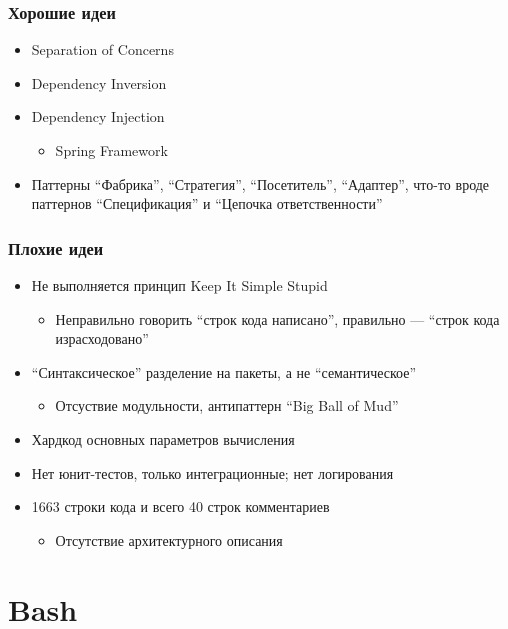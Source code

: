 \documentclass{../text-style}
\begin{document}
    \begin{frame}
        \frametitle{Хорошие идеи}
        \begin{itemize}
            \item Separation of Concerns
            \item Dependency Inversion
            \item Dependency Injection
            \begin{itemize}
                \item Spring Framework
            \end{itemize}
            \item Паттерны ``Фабрика'', ``Стратегия'', ``Посетитель'', ``Адаптер'', что-то вроде паттернов ``Спецификация'' и ``Цепочка ответственности''
        \end{itemize}
    \end{frame}

    \begin{frame}
        \frametitle{Плохие идеи}
        \begin{itemize}
            \item Не выполняется принцип Keep It Simple Stupid
            \begin{itemize}
                \item Неправильно говорить ``строк кода написано'', правильно --- ``строк кода израсходовано''
            \end{itemize}
            \item ``Синтаксическое'' разделение на пакеты, а не ``семантическое''
            \begin{itemize}
                \item Отсуствие модульности, антипаттерн ``Big Ball of Mud''
            \end{itemize}
            \item Хардкод основных параметров вычисления
            \item Нет юнит-тестов, только интеграционные; нет логирования
            \item 1663 строки кода и всего 40 строк комментариев
            \begin{itemize}
                \item Отсутствие архитектурного описания
            \end{itemize}
        \end{itemize}
    \end{frame}

    \section{Bash}
\end{document}
